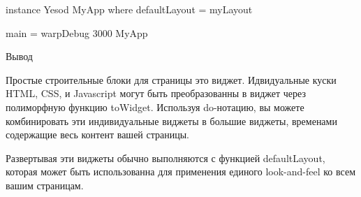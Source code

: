 instance Yesod MyApp where
    defaultLayout = myLayout

main = warpDebug 3000 MyApp

Вывод

Простые строительные блоки для страницы это виджет. Идвидуальные куски HTML, CSS, и Javascript могут быть преобразованны в виджет через полиморфную функцию toWidget. Используя do-нотацию, вы можете комбинировать эти индивидуальные виджеты в большие виджеты, временами содержащие весь контент вашей страницы.

Развертывая эти виджеты обычно выполняются с функцией defaultLayout, которая может быть использованна для применения единого look-and-feel ко всем вашим страницам.